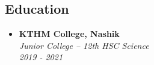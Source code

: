 \documentclass[11pt, oneside, a4paper, titlepage]{article}
\begin{document}
\begin{tcolorbox}
\begin{minipage}[t]{11cm}
\begin{tcolorbox}[grow to right by=0.75cm,colframe=white,colback=white]
      \section*{Education}
      \begin{itemize}
        \item
        {
          \textbf{KTHM College, Nashik} \\
          \textit{Junior College -- 12th HSC Science} \\
          \textit{2019 - 2021} \\
        }
      \end{itemize}
    \end{tcolorbox}
  \end{minipage}
\end{tcolorbox}
\end{document}
